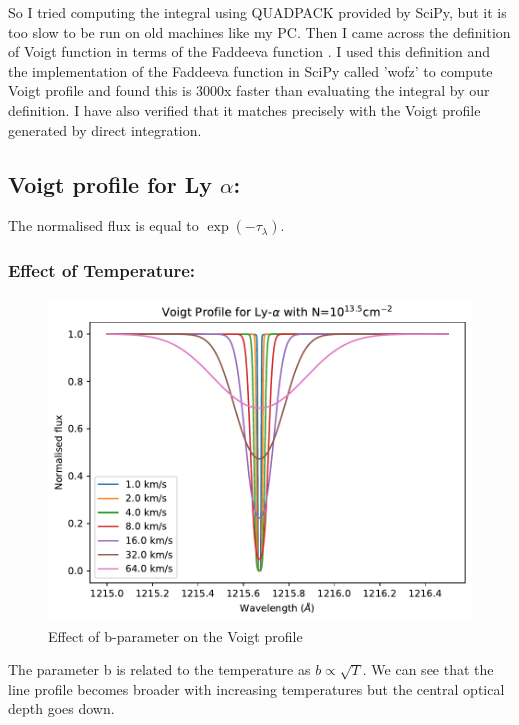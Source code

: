 \documentclass[12pt]{article}
\begin{document}
So I tried computing the integral using QUADPACK provided by SciPy, but it is too slow to be run on old machines like my PC. Then I came across the definition of Voigt function in terms of the Faddeeva function \cite{scipython}. I used this definition and the implementation of the Faddeeva function in SciPy called 'wofz' to compute Voigt profile and found this is 3000x faster than evaluating the integral by our definition. I have also verified that it matches precisely with the Voigt profile generated by direct integration.






\subsection{Voigt profile for Ly $\alpha$:}
The normalised flux is equal to $\exp (-\tau_{\lambda})$.
\subsubsection{Effect of Temperature:}


\begin{figure}[H]
\centering
\includegraphics[width=1\linewidth]{../Voigt-Ly-a_vary_b}
\caption{Effect of b-parameter on the Voigt profile}
\label{fig:voigt-ly-a_vary_b}
\end{figure}

The parameter b is related to the temperature as $b \propto \sqrt{T}$. We can see that the line profile becomes broader with increasing temperatures but the central optical depth goes down.
\end{document}
